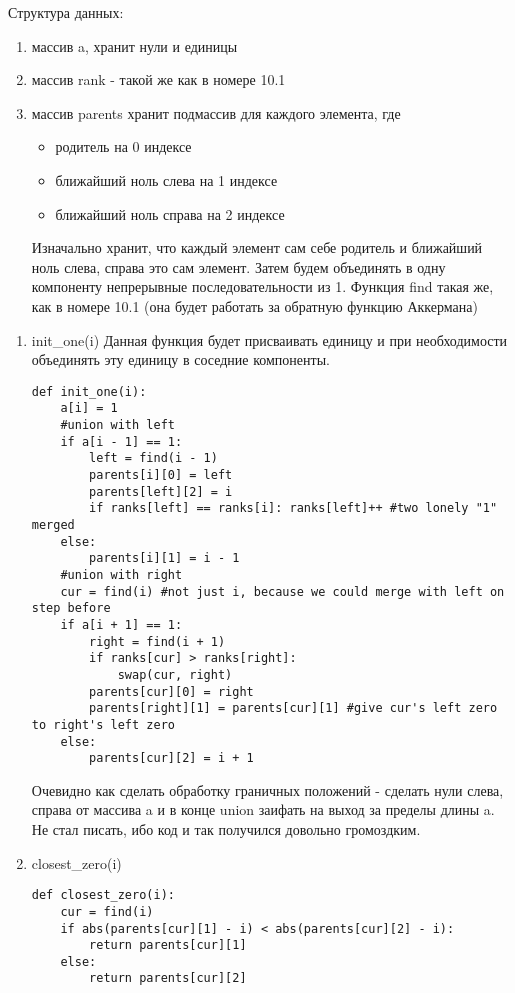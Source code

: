 \documentclass[12pt]{article}
\begin{document}
Структура данных:
\begin{enumerate}
    \item массив a, хранит нули и единицы 
    \item массив rank - такой же как в номере 10.1
    \item массив parents хранит подмассив для каждого элемента, где 
    \begin{itemize}
        \item родитель на 0 индексе
        \item ближайший ноль слева на 1 индексе
        \item ближайший ноль справа на 2 индексе
    \end{itemize}
    
    Изначально хранит, что каждый элемент сам себе родитель и ближайший ноль слева, справа это сам элемент. Затем будем объединять в одну компоненту непрерывные последовательности из 1. Функция find такая же, как в номере 10.1 (она будет работать за обратную функцию Аккермана)
\end{enumerate}
\begin{enumerate}
    \item init\_one(i) Данная функция будет присваивать единицу и при необходимости объединять эту единицу в соседние компоненты.
    \begin{lstlisting}
def init_one(i):
    a[i] = 1
    #union with left
    if a[i - 1] == 1:
        left = find(i - 1)
        parents[i][0] = left
        parents[left][2] = i
        if ranks[left] == ranks[i]: ranks[left]++ #two lonely "1" merged
    else:
        parents[i][1] = i - 1
    #union with right
    cur = find(i) #not just i, because we could merge with left on step before
    if a[i + 1] == 1:
        right = find(i + 1)
        if ranks[cur] > ranks[right]:
            swap(cur, right)
        parents[cur][0] = right
        parents[right][1] = parents[cur][1] #give cur's left zero to right's left zero 
    else:
        parents[cur][2] = i + 1
    \end{lstlisting}

Очевидно как сделать обработку граничных положений - сделать нули слева, справа от массива a и в конце union заифать на выход за пределы длины a. Не стал писать, ибо код и так получился довольно громоздким.

    \item closest\_zero(i)
    \begin{lstlisting}
def closest_zero(i):
    cur = find(i)
    if abs(parents[cur][1] - i) < abs(parents[cur][2] - i):
        return parents[cur][1]
    else:
        return parents[cur][2]
    \end{lstlisting}
\end{enumerate}
\end{document}
